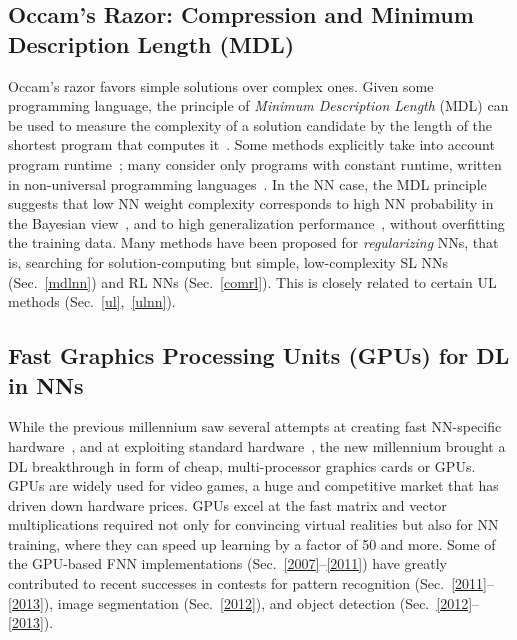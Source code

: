 \documentclass[letterpaper]{article}
\begin{document}
\begin{CJK*}{UTF8}{gbsn}
\begin{sloppypar}
\subsection{Occam's Razor: Compression and Minimum Description Length (MDL)}
\label{mdl}

Occam's razor favors simple solutions over complex ones.
Given some programming language,
the principle of {\em Minimum Description Length} (MDL) can be used 
to measure the complexity of a solution candidate by
the length of the shortest program that 
computes it~\citep[e.g.,][]{Solomonoff:64,Kolmogorov:65,Chaitin:66,Wallace:68,Levin:73a,Solomonoff:78,Rissanen:86,Blumer:87,LiVitanyi:97,gruenwald2005}.
Some methods explicitly take into account program runtime~\citep{Allender:92,Watanabe:92,Schmidhuber:97nn+,Schmidhuber:02colt}; 
many consider only programs with constant runtime, written
in non-universal programming languages~\citep[e.g.,][]{Rissanen:86,Hinton:93}.
In the NN case, 
the MDL principle suggests that low NN weight complexity
corresponds to high NN probability 
in the  Bayesian view~\citep[e.g.,][]{MacKay:92b,Buntine:91,neal1995,freitas2003},
and to high generalization performance~\citep[e.g.,][]{BaumHaussler:89}, 
without overfitting the training data.
Many methods have been proposed for {\em regularizing} NNs, that is, 
searching for solution-computing but simple, low-complexity SL NNs (Sec.~\ref{mdlnn}) 
and RL NNs (Sec.~\ref{comrl}).
This is closely 
related to certain UL methods (Sec.~\ref{ul},~\ref{ulnn}).



\subsection{Fast Graphics Processing Units (GPUs) for DL in NNs}
\label{gpu}

While the previous millennium saw several attempts at creating fast NN-specific hardware~\citep[e.g.,][]{jackel-90,faggin92,ramacher93,widrow94,heemskerk1995,cbm97,urlbe1999},
and at exploiting standard hardware~\citep[e.g.,][]{anguita1994,muller1995,anguita1996},
the new millennium brought a DL breakthrough in form of cheap, multi-processor
graphics cards or GPUs. GPUs are widely used for video games, a huge and competitive market
that has driven down hardware prices.
GPUs excel at the fast matrix and vector multiplications required not only for 
convincing virtual realities but also for NN training, 
where they can speed up learning by a factor of  50 and more.
Some of the GPU-based FNN implementations (Sec.~\ref{2007}--\ref{2011}) have greatly contributed to recent successes in contests for pattern recognition (Sec.~\ref{2011}--\ref{2013}),
image segmentation (Sec.~\ref{2012}),
and object detection (Sec.~\ref{2012}--\ref{2013}).
 



\end{sloppypar}
\end{CJK*}
\end{document}
